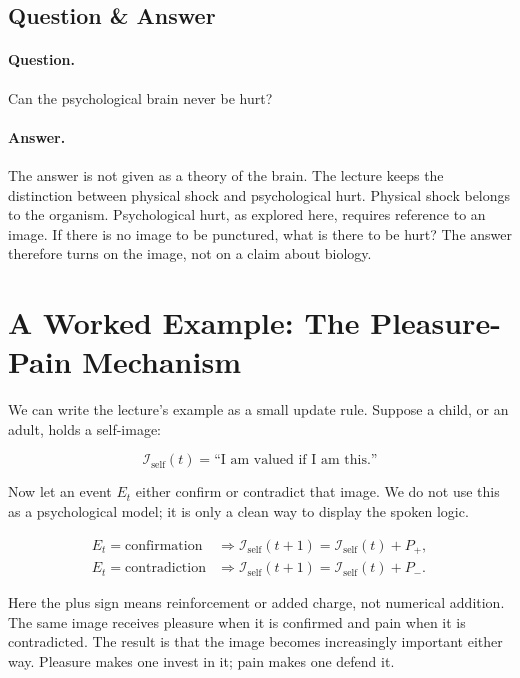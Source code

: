 \subsection{Question \& Answer}

\paragraph{Question.}
Can the psychological brain never be hurt?

\paragraph{Answer.}
The answer is not given as a theory of the brain. The lecture keeps the distinction between physical shock and psychological hurt. Physical shock belongs to the organism. Psychological hurt, as explored here, requires reference to an image. If there is no image to be punctured, what is there to be hurt? The answer therefore turns on the image, not on a claim about biology.

\section{A Worked Example: The Pleasure-Pain Mechanism}

We can write the lecture's example as a small update rule. Suppose a child, or an adult, holds a self-image:

\begin{equation}
\mathcal{I}_{\text{self}}(t)
=
\text{``I am valued if I am this.''}
\end{equation}

Now let an event \(E_t\) either confirm or contradict that image. We do not use this as a psychological model; it is only a clean way to display the spoken logic.

\begin{align}
E_t = \text{confirmation}
&\Rightarrow
\mathcal{I}_{\text{self}}(t+1) = \mathcal{I}_{\text{self}}(t) + P_{+}, \\
E_t = \text{contradiction}
&\Rightarrow
\mathcal{I}_{\text{self}}(t+1) = \mathcal{I}_{\text{self}}(t) + P_{-}.
\end{align}

Here the plus sign means reinforcement or added charge, not numerical addition. The same image receives pleasure when it is confirmed and pain when it is contradicted. The result is that the image becomes increasingly important either way. Pleasure makes one invest in it; pain makes one defend it.

